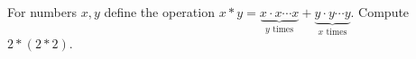 For numbers $x, y$ define the operation $x*y=\underbrace{x \cdot x \cdots x}_{y\text{ times}}+\underbrace{y \cdot y \cdots y}_{x\text{ times}}$. Compute $2*(2*2)$.
